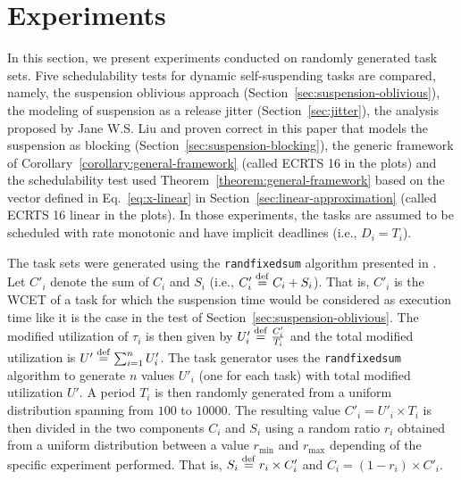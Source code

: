 \section{Experiments}
\label{sec:experiments}

In this section, we present experiments conducted on randomly generated task sets. Five schedulability tests for dynamic self-suspending tasks are compared, namely, the suspension oblivious approach (Section~\ref{sec:suspension-oblivious}), the modeling of suspension as a release jitter (Section~\ref{sec:jitter}), the analysis proposed by Jane W.S. Liu and proven correct in this paper that models the suspension as blocking (Section~\ref{sec:suspension-blocking}), the generic framework of Corollary~\ref{corollary:general-framework} (called ECRTS 16 in the plots) and the schedulability test used Theorem~\ref{theorem:general-framework} based on the vector defined in Eq.~\eqref{eq:x-linear} in Section~\ref{sec:linear-approximation} (called ECRTS 16 linear in the plots). In those experiments, the tasks are assumed to be scheduled with rate monotonic and have implicit deadlines (i.e., $D_i = T_i$).

The task sets were generated using the \texttt{randfixedsum} algorithm presented in \cite{Emberson-taskSetGeneration-2010}. Let $C'_i$ denote the sum of $C_i$ and $S_i$ (i.e., $C'_i \stackrel{\mathrm{def}}{=} C_i + S_i$). That is, $C'_i$ is the WCET of a task for which the suspension time would be considered as execution time like it is the case in the test of Section~\ref{sec:suspension-oblivious}. The modified utilization of $\tau_i$ is then given by $U'_i \stackrel{\mathrm{def}}{=} \frac{C'_i}{T_i}$ and the total modified utilization is $U' \stackrel{\mathrm{def}}{=} \sum_{i=1}^n U'_i$. The task generator uses the \texttt{randfixedsum} algorithm to generate $n$ values $U'_i$ (one for each task) with total modified utilization $U'$. A period $T_i$ is then randomly generated from a uniform distribution spanning from $100$ to $10000$. The resulting value $C'_i = U'_i \times T_i$ is then divided in the two components $C_i$ and $S_i$ using a random ratio $r_i$ obtained from a uniform distribution between a value $r_{\min}$ and $r_{\max}$ depending of the specific experiment performed. That is, $S_i \stackrel{\mathrm{def}}{=} r_i \times C'_i$ and $C_i = (1 - r_i) \times C'_i$. 

